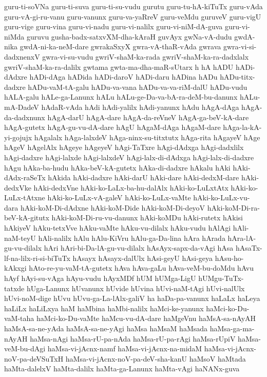 {guru-ti-soVNa
guru-ti-suva
guru-ti-su-vudu
gurutu
guru-tu-hA-kiTuTx
guru-vAda
guru-vA-gi-ru-vanu
guru-vanunx
guru-va-yaRreV
guru-veMdu
guruveV
guru-vigU
guru-vige
guru-vina
guru-vi-nadu
guru-vi-nalilx
guru-vi-niM-dA-guva
guru-vi-niMda
guruvu
gusha-badx-satxvXM-dha-kAraH
guvAyx
gwNa-vA-dudu
gwdA-nika
gwdA-ni-ka-neM-dare
gwrakaSxyX
gwra-vA-thaR-vAda
gwrava
gwra-vi-si-dadxnenxV
gwra-vi-su-vudu
gwriV-shaM-ka-rada
gwriV-shaM-ka-ra-dadxlalx
gwriV-shaM-ka-ra-dalilx
gwtama
gwta-ma-dha-maR-sUtarx
h
hA
hADU
hADi-dAdxre
hADi-dAga
hADida
hADi-daroV
hADi-daru
hADina
hADu
hADu-titx-dadxre
hADu-vaM-tA-galu
hADu-va-vana
hADu-va-va-riM-dalU
hADu-vudu
hALA-galu
hALe-ga-Lanunx
hALu
hALu-ge-Da-va-bA-ra-deM-bu-danunx
hALu-mA-DadeV
hAdaR-vAda
hAdi
hAdi-yalilx
hAdi-yanunx
hAdu
hAgA-dAga
hAgA-da-dadxnunx
hAgA-darU
hAgA-dare
hAgA-da-reVneV
hAgA-ga-beV-kA-dare
hAgA-gutetx
hAgA-gu-vu-dA-dare
hAgU
hAgaM-dAga
hAgaM-dare
hAga-la-kA-yi-gojujx
hAgalalx
hAga-lalxdeV
hAga-ninx-su-titxtutx
hAga-rita
hAgayeV
hAge
hAgeV
hAgelAlx
hAgeye
hAgeyeV
hAgi-TaTxre
hAgi-dAdxga
hAgi-dadxlilx
hAgi-dadxre
hAgi-lalxde
hAgi-lalxdeV
hAgi-lalx-di-dAdxga
hAgi-lalx-di-dadxre
hAgu
hAka-ba-hudu
hAka-beV-kA-gutetx
hAka-di-dadxre
hAkalu
hAki
hAki-dAdx-raSeTx
hAkida
hAki-dadxre
hAki-darU
hAki-dare
hAki-dedxM-dare
hAki-dedxVke
hAki-dedxVne
hAki-ko-LaLx-ba-hu-dalAlx
hAki-ko-LuLxtAtx
hAki-ko-LuLx-tAtxne
hAki-ko-LuLx-vA-galeV
hAki-ko-LuLx-vaMte
hAki-ko-LuLx-vu-dara
hAki-koM-Di-dAdxne
hAki-koM-Dide
hAki-koM-Di-deyoV
hAki-koM-Di-ra-beV-kA-gitutx
hAki-koM-Di-ru-vu-danunx
hAki-koMDu
hAki-rutetx
hAkisi
hAkiyeV
hAku-tetxVve
hAku-vaMte
hAku-vu-dilalx
hAku-vudu
hAlAgi
hAli-naM-teyU
hAli-nalilx
hAlu
hAlu-KiVru
hAlu-ga-Da-lina
hAra
hArada
hAra-lA-gu-vu-dilalx
hAri
hAri-bi-Da-lA-gu-vu-dilalx
hAsAyx-sapx-da-vAgi
hAsa
hAsaTx-lf-na-lilx-ri-si-biTuTx
hAsayx
hAsayx-dalUlx
hAsi-geyU
hAsi-geya
hAsu-ho-kAkxgi
hAto-re-yu-vaM-tA-gutetx
hAva
hAva-gaLu
hAva-veM-bu-doMdu
hAvu
hAyf
hAyi-su-vAga
hAyu-vudu
hAyxMDf
hUM
hUMga-LigU
hUMgu-TuTx-tatxde
hUga-Lanunx
hUvanunx
hUvide
hUvina
hUvi-naM-tAgi
hUvi-nalUlx
hUvi-noM-dige
hUvu
hUvu-ga-La-lAlx-galiV
ha
haDa-pa-vanunx
haLaLx
haLeya
haLiLx
haLiLxya
haM
haMbina
haMbi-nalilx
haMci-ke-yanunx
haMci-ko-Du-vaM-taha
haMci-ko-Du-vaMte
haMcu-vu-dA-dare
haMgeVnu
haMsA-sa-nAyAH
haMsA-sa-ne-yAda
haMsA-sa-ne-yAgi
haMsa
haMsaM
haMsada
haMsa-ga-ma-nAyAH
haMsa-nAgi
haMsa-rU-pa-nAda
haMsa-rU-pa-rAgi
haMsa-rUpiV
haMsa-veM-bu-dAgi
haMsa-vi-jAcnx-namf
haMsa-vi-jAcnx-na-midaM
haMsa-vi-jAcnx-noV-pa-deVSuTxH
haMsa-vi-jAcnx-noV-pa-deV-sha-kanU
haMsoV
haMtada
haMta-dalelxV
haMta-dalilx
haMta-ga-Lanunx
haMta-vAgi
haNANx-guva
}
